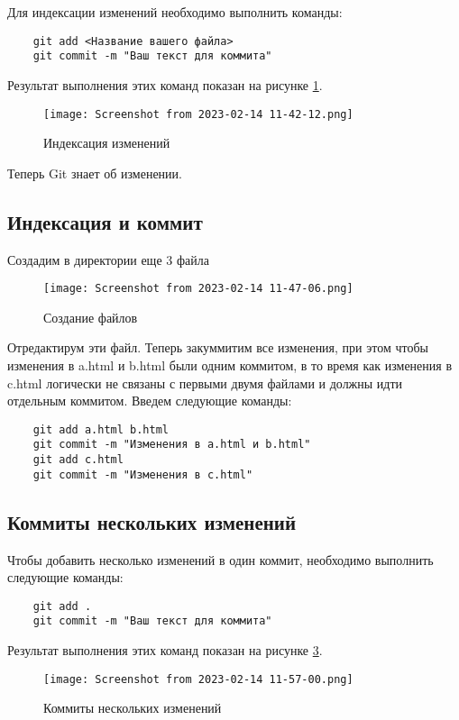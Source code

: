 Для индексации изменений необходимо выполнить команды:

\begin{verbatim}
	git add <Название вашего файла>
	git commit -m "Ваш текст для коммита"
\end{verbatim}

Результат выполнения этих команд показан на рисунке \ref{fig:git:second_commit}.

\begin{figure}[hp]
	\centering
	\texttt{[image: Screenshot from 2023-02-14 11-42-12.png]}
	\caption{Индексация изменений}
	\label{fig:git:second_commit}
\end{figure}
Теперь Git знает об изменении.

\subsection{Индексация и коммит}
Создадим в директории еще 3 файла
\begin{figure}[hp]
	\centering
	\texttt{[image: Screenshot from 2023-02-14 11-47-06.png]}
	\caption{Создание файлов}
	\label{fig:git:files}
\end{figure}
Отредактирум эти файл. Теперь  закуммитим все изменения, при этом чтобы изменения в a.html и b.html были одним
коммитом, в то время как изменения в c.html логически не связаны с первыми двумя
файлами и должны идти отдельным коммитом.
Введем следующие команды:
\begin{verbatim}
	git add a.html b.html
	git commit -m "Изменения в a.html и b.html"
	git add c.html
	git commit -m "Изменения в c.html"
\end{verbatim}

\subsection{Коммиты нескольких изменений}
Чтобы добавить несколько изменений в один коммит, необходимо выполнить следующие команды:
\begin{verbatim}
	git add .
	git commit -m "Ваш текст для коммита"
\end{verbatim}
Результат выполнения этих команд показан на рисунке \ref{fig:git:commit}.
\begin{figure}[hp]
	\centering
	\texttt{[image: Screenshot from 2023-02-14 11-57-00.png]}
	\caption{Коммиты нескольких изменений}
	\label{fig:git:commit}
\end{figure}

